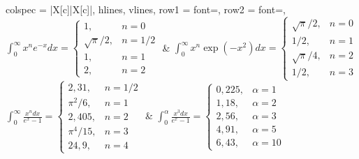 \documentclass{article}
\begin{document}
\begin{tblr}{
    colspec = {|X[c]|X[c]|},
    hlines,
    vlines,
    row{1} = {font=\normalsize},
    row{2} = {font=\normalsize},
}
$\displaystyle\int_0^\infty x^n e^{-x} dx = \begin{cases}
1, & n = 0 \\
\sqrt{\pi}/2, & n = 1/2 \\
1, & n = 1 \\
2, & n = 2
\end{cases}$ &
$\displaystyle\int_0^\infty x^n \exp(-x^2) dx = \begin{cases}
\sqrt{\pi}/2, & n = 0 \\
1/2, & n = 1 \\
\sqrt{\pi}/4, & n = 2 \\
1/2, & n = 3
\end{cases}$ \\
$\displaystyle\int_0^\infty \frac{x^n dx}{e^x - 1} = \begin{cases}
2{,}31, & n = 1/2 \\
\pi^2/6, & n = 1 \\
2{,}405, & n = 2 \\
\pi^4/15, & n = 3 \\
24{,}9, & n = 4
\end{cases}$ &
$\displaystyle\int_0^\alpha \frac{x^3 dx}{e^x - 1} = \begin{cases}
0{,}225, & \alpha = 1 \\
1{,}18, & \alpha = 2 \\
2{,}56, & \alpha = 3 \\
4{,}91, & \alpha = 5 \\
6{,}43, & \alpha = 10
\end{cases}$ \\
\end{tblr}
\end{document}
